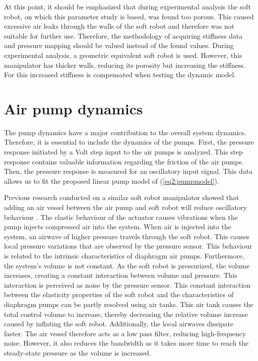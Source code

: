 At this point, it should be emphasized that during experimental analysis the soft robot, on which this parameter study is based, was found too porous. This caused excessive air leaks through the walls of the soft robot and therefore was not suitable for further use. Therefore, the methodology of acquiring stiffness data and pressure mapping should be valued instead of the found values. During experimental analysis, a geometric equivalent soft robot is used. However, this manipulator has thicker walls, reducing its porosity but increasing the stiffness. For this increased stiffness is compensated when testing the dynamic model. 




\section{Air pump dynamics}



The pump dynamics have a major contribution to the overall system dynamics. Therefore, it is essential to include the dynamics of the pumps. First, the pressure response initiated by a Volt step input to the air pumps is analyzed. This step response contains valuable information regarding the friction of the air pumps. Then, the pressure response is measured for an oscillatory input signal. This data allows us to fit the proposed linear pump model of (\ref{eq2:pumpmodel}).


Previous research conducted on a similar soft robot manipulator showed that adding an air vessel between the air pump and soft robot will reduce oscillatory behaviour \cite{proper}. The elastic behaviour of the actuator causes vibrations when the pump injects compressed air into the system. When air is injected into the system, an airwave of higher pressure travels through the soft robot. This causes local pressure variations that are observed by the pressure sensor. This behaviour is related to the intrinsic characteristics of diaphragm air pumps. Furthermore, the system's volume is not constant. As the soft robot is pressurized, the volume increases, creating a constant interaction between volume and pressure. This interaction is perceived as noise by the pressure sensor. This constant interaction between the elasticity properties of the soft robot and the characteristics of diaphragm pumps can be partly resolved using air tanks. This air tank causes the total control volume to increase, thereby decreasing the relative volume increase caused by inflating the soft robot. Additionally, the local airwaves dissipate faster. The air vessel therefore acts as a low pass filter, reducing high-frequency noise. However, it also reduces the bandwidth as it takes more time to reach the steady-state pressure as the volume is increased. 

